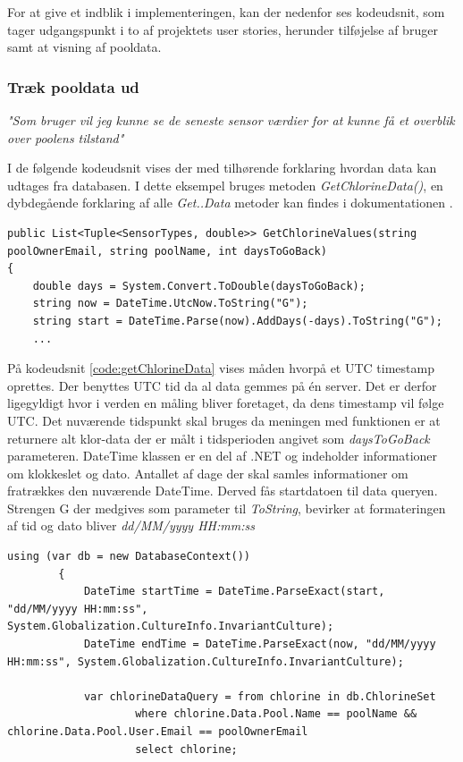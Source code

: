 For at give et indblik i implementeringen, kan der nedenfor ses kodeudsnit, som tager udgangspunkt i to af projektets user stories, herunder tilføjelse af bruger samt at visning af pooldata.

\subsubsection{Træk pooldata ud}

\textit{"Som bruger vil jeg kunne se de seneste sensor værdier for at kunne få et overblik over poolens tilstand"}\

I de følgende kodeudsnit vises der med tilhørende forklaring hvordan data kan udtages fra databasen. I dette eksempel bruges metoden \textit{GetChlorineData()}, en dybdegående forklaring af alle \textit{Get..Data} metoder kan findes i dokumentationen .

\begin{lstlisting}[caption=GetChlorineData method - konvertering af DateTime objekter, label=code:getChlorineData]
public List<Tuple<SensorTypes, double>> GetChlorineValues(string poolOwnerEmail, string poolName, int daysToGoBack)
{
	double days = System.Convert.ToDouble(daysToGoBack);
	string now = DateTime.UtcNow.ToString("G");
	string start = DateTime.Parse(now).AddDays(-days).ToString("G");
	...
\end{lstlisting}

På kodeudsnit \ref{code:getChlorineData} vises måden hvorpå et UTC timestamp oprettes. Der benyttes UTC tid da al data gemmes på én server. Det er derfor ligegyldigt hvor i verden en måling bliver foretaget, da dens timestamp vil følge UTC. Det nuværende tidspunkt skal bruges da meningen med funktionen er at returnere alt klor-data der er målt i tidsperioden angivet som \textit{daysToGoBack} parameteren. DateTime \cite{dotnetdatetime} klassen er en del af .NET og indeholder informationer om klokkeslet og dato. Antallet af dage der skal samles informationer om fratrækkes den nuværende DateTime. Derved fås startdatoen til data queryen. Strengen G der medgives som parameter til \textit{ToString}, bevirker at formateringen af tid og dato bliver \textit{dd/MM/yyyy HH:mm:ss}

\begin{lstlisting}[caption=Konvertering tilbage til DateTime objekter,label=code:convertToDateTime]
using (var db = new DatabaseContext())
		{   
			DateTime startTime = DateTime.ParseExact(start, "dd/MM/yyyy HH:mm:ss", System.Globalization.CultureInfo.InvariantCulture);
			DateTime endTime = DateTime.ParseExact(now, "dd/MM/yyyy HH:mm:ss", System.Globalization.CultureInfo.InvariantCulture);

			var chlorineDataQuery = from chlorine in db.ChlorineSet
					where chlorine.Data.Pool.Name == poolName && chlorine.Data.Pool.User.Email == poolOwnerEmail
					select chlorine;

\end{lstlisting}

